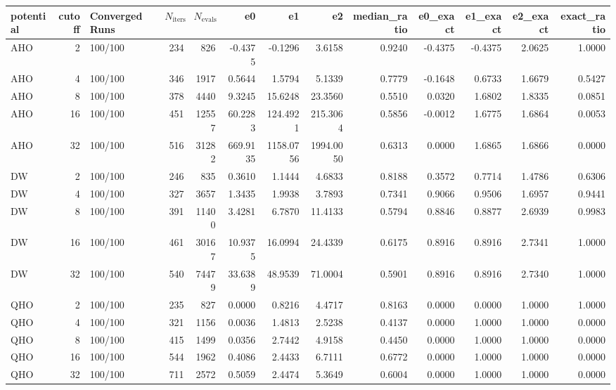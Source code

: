 \begin{tabular}{lrlrrrrrrrrrr}
\toprule
potential & cutoff & Converged Runs & $N_{\text{iters}}$ & $N_{\text{evals}}$ & e0 & e1 & e2 & median_ratio & e0_exact & e1_exact & e2_exact & exact_ratio \\
\midrule
AHO & 2 & 100/100 & 234 & 826 & -0.4375 & -0.1296 & 3.6158 & 0.9240 & -0.4375 & -0.4375 & 2.0625 & 1.0000 \\
AHO & 4 & 100/100 & 346 & 1917 & 0.5644 & 1.5794 & 5.1339 & 0.7779 & -0.1648 & 0.6733 & 1.6679 & 0.5427 \\
AHO & 8 & 100/100 & 378 & 4440 & 9.3245 & 15.6248 & 23.3560 & 0.5510 & 0.0320 & 1.6802 & 1.8335 & 0.0851 \\
AHO & 16 & 100/100 & 451 & 12557 & 60.2283 & 124.4921 & 215.3064 & 0.5856 & -0.0012 & 1.6775 & 1.6864 & 0.0053 \\
AHO & 32 & 100/100 & 516 & 31282 & 669.9135 & 1158.0756 & 1994.0050 & 0.6313 & 0.0000 & 1.6865 & 1.6866 & 0.0000 \\
DW & 2 & 100/100 & 246 & 835 & 0.3610 & 1.1444 & 4.6833 & 0.8188 & 0.3572 & 0.7714 & 1.4786 & 0.6306 \\
DW & 4 & 100/100 & 327 & 3657 & 1.3435 & 1.9938 & 3.7893 & 0.7341 & 0.9066 & 0.9506 & 1.6957 & 0.9441 \\
DW & 8 & 100/100 & 391 & 11400 & 3.4281 & 6.7870 & 11.4133 & 0.5794 & 0.8846 & 0.8877 & 2.6939 & 0.9983 \\
DW & 16 & 100/100 & 461 & 30167 & 10.9375 & 16.0994 & 24.4339 & 0.6175 & 0.8916 & 0.8916 & 2.7341 & 1.0000 \\
DW & 32 & 100/100 & 540 & 74479 & 33.6389 & 48.9539 & 71.0004 & 0.5901 & 0.8916 & 0.8916 & 2.7340 & 1.0000 \\
QHO & 2 & 100/100 & 235 & 827 & 0.0000 & 0.8216 & 4.4717 & 0.8163 & 0.0000 & 0.0000 & 1.0000 & 1.0000 \\
QHO & 4 & 100/100 & 321 & 1156 & 0.0036 & 1.4813 & 2.5238 & 0.4137 & 0.0000 & 1.0000 & 1.0000 & 0.0000 \\
QHO & 8 & 100/100 & 415 & 1499 & 0.0356 & 2.7442 & 4.9158 & 0.4450 & 0.0000 & 1.0000 & 1.0000 & 0.0000 \\
QHO & 16 & 100/100 & 544 & 1962 & 0.4086 & 2.4433 & 6.7111 & 0.6772 & 0.0000 & 1.0000 & 1.0000 & 0.0000 \\
QHO & 32 & 100/100 & 711 & 2572 & 0.5059 & 2.4474 & 5.3649 & 0.6004 & 0.0000 & 1.0000 & 1.0000 & 0.0000 \\
\bottomrule
\end{tabular}
